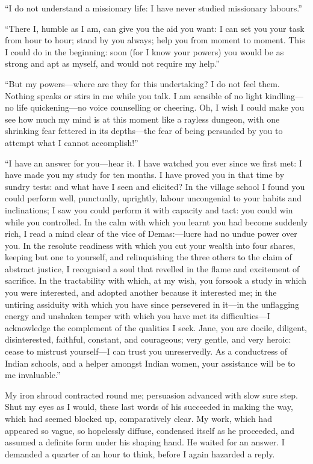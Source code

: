 \enquote{I do not understand a missionary life: I have never studied
missionary labours.}

\enquote{There I, humble as I am, can give you the aid you want: I can
set you your task from hour to hour; stand by you always; help you from
moment to moment. This I could do in the beginning: soon (for I know
your powers) you would be as strong and apt as myself, and would not
require my help.}

\enquote{But my powers---where are they for this undertaking? I do not
feel them. Nothing speaks or stirs in me while you talk. I am sensible
of no light kindling---no life quickening---no voice counselling or
cheering. Oh, I wish I could make you see how much my mind is at this
moment like a rayless dungeon, with one shrinking fear fettered in its
depths---the fear of being persuaded by you to attempt what I cannot
accomplish!}

\enquote{I have an answer for you---hear it. I have watched you ever
since we first met: I have made you my study for ten months. I have
proved you in that time by sundry tests: and what have I seen and
elicited? In the village school I found you could perform well,
punctually, uprightly, labour uncongenial to your habits and
inclinations; I saw you could perform it with capacity and tact: you
could win while you controlled. In the calm with which you learnt you
had become suddenly rich, I read a mind clear of the vice of
Demas:---lucre had no undue power over you. In the resolute readiness
with which you cut your wealth into four shares, keeping but one to
yourself, and relinquishing the three others to the claim of abstract
justice, I recognised a soul that revelled in the flame and excitement
of sacrifice. In the tractability with which, at my wish, you forsook a
study in which you were interested, and adopted another because it
interested me; in the untiring assiduity with which you have since
persevered in it---in the unflagging energy and unshaken temper with
which you have met its difficulties---I acknowledge the complement of
the qualities I seek. Jane, you are docile, diligent, disinterested,
faithful, constant, and courageous; very gentle, and very heroic: cease
to mistrust yourself---I can trust you unreservedly. As a conductress
of Indian schools, and a helper amongst Indian women, your assistance
will be to me invaluable.}

My iron shroud contracted round me; persuasion advanced with slow sure
step. Shut my eyes as I would, these last words of his succeeded in
making the way, which had seemed blocked up, comparatively clear. My
work, which had appeared so vague, so hopelessly diffuse, condensed
itself as he proceeded, and assumed a definite form under his shaping
hand. He waited for an answer. I demanded a quarter of an hour to
think, before I again hazarded a reply.

